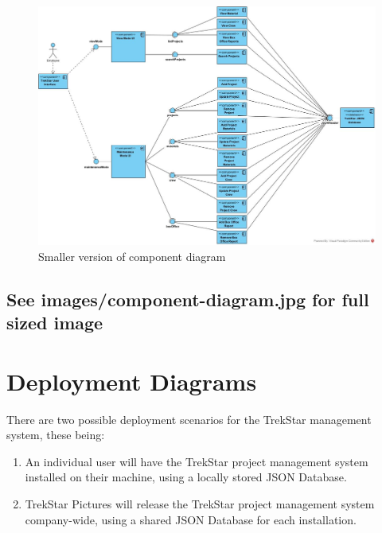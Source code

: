 \documentclass[
  english,
  a4paper,
,tablecaptionabove
]{scrartcl}
\providecommand{\tightlist}{%
  \setlength{\itemsep}{0pt}\setlength{\parskip}{0pt}}
\begin{document}
\begin{figure}
\centering
\includegraphics{images/component-diagram/component-diagram.jpg}
\caption{Smaller version of component diagram}
\end{figure}

\hypertarget{see-imagescomponent-diagram.jpg-for-full-sized-image}{%
\subsection{See images/component-diagram.jpg for full sized
image}\label{see-imagescomponent-diagram.jpg-for-full-sized-image}}

\newpage

\hypertarget{deployment-diagrams}{%
\section{Deployment Diagrams}\label{deployment-diagrams}}

There are two possible deployment scenarios for the TrekStar management
system, these being:

\begin{enumerate}
\def\labelenumi{\arabic{enumi}.}
\tightlist
\item
  An individual user will have the TrekStar project management system
  installed on their machine, using a locally stored JSON Database.
\item
  TrekStar Pictures will release the TrekStar project management system
  company-wide, using a shared JSON Database for each installation.
\end{enumerate}
\end{document}
